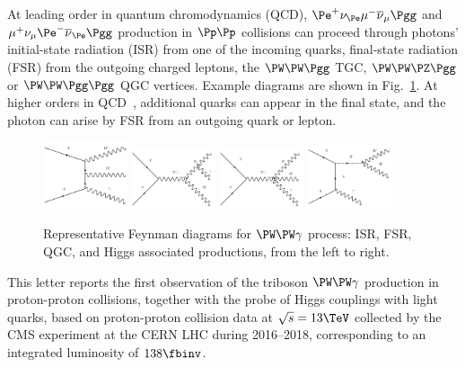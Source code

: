 At leading order in quantum chromodynamics (QCD), $\Pe^+\nu_{\Pe}\mu^-\overline{\nu}_{\mu}\Pgg$ and $\mu^+\nu_{\mu}\Pe^-\overline{\nu}_{\Pe}\Pgg$ production in $\Pp\Pp$ collisions can proceed through photons' initial-state radiation (ISR) from one of the incoming quarks, final-state radiation (FSR) from the outgoing charged leptons, the $\PW\PW\Pgg$ TGC, $\PW\PW\PZ\Pgg$ or $\PW\PW\Pgg\Pgg$ QGC vertices. Example diagrams are shown in Fig.~\ref{fig:LO diagrams}. At higher orders in QCD~\cite{Zhu:2020ous}, additional quarks can appear in the final state, and the photon can arise by FSR from an outgoing quark or lepton. 

\begin{figure}[htp]
    \centering
    \includegraphics[width=0.22\textwidth]{ISR.pdf}
    \includegraphics[width=0.22\textwidth]{FSR.pdf}
    \includegraphics[width=0.22\textwidth]{aQGC.pdf}
    \includegraphics[width=0.22\textwidth]{HG.pdf}
    \caption{Representative Feynman diagrams for $\PW\PW\gamma$ process: ISR, FSR, QGC, and Higgs associated productions, from the left to right.}
    \label{fig:LO diagrams}
\end{figure}

This letter reports the first observation of the triboson $\PW\PW\gamma$ production in proton-proton collisions, together with the probe of Higgs couplings with light quarks, based on proton-proton collision data at $\sqrt{s} = 13\TeV$ collected by the CMS experiment at the CERN LHC during 2016--2018, corresponding to an integrated luminosity of $138\fbinv$.


